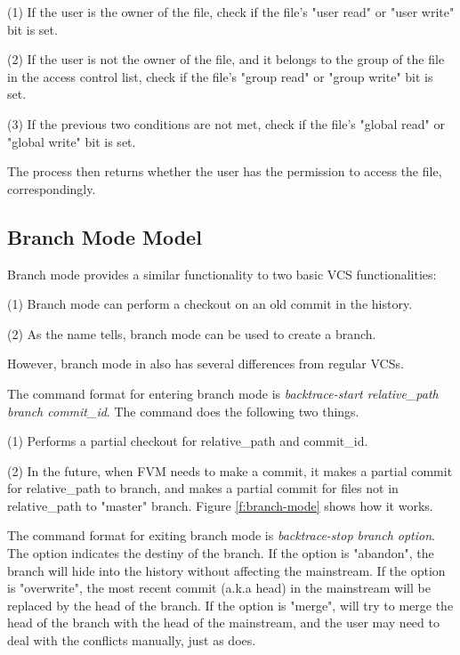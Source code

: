 (1) If the user is the owner of the file, check if the file's "user read" or
"user write" bit is set.

(2) If the user is not the owner of the file, and it belongs to the group of the
file in the access control list, check if the file's "group read" or "group
write" bit is set.

(3) If the previous two conditions are not met, check if the file's "global
read" or "global write" bit is set.

The process then returns whether the user has the permission to access the file,
correspondingly.


\subsection{Branch Mode Model}

Branch mode provides a similar functionality to two basic VCS functionalities:

(1) Branch mode can perform a checkout on an old commit in the history.

(2) As the name tells, branch mode can be used to create a branch.

However, branch mode in \sys also has several differences from regular VCSs.

The command format for entering branch mode is \textit{backtrace-start relative\_path
branch commit\_id}. The command does the following two things.

(1) Performs a partial checkout for relative\_path and commit\_id.

(2) In the future, when FVM needs to make a commit, it makes a partial
commit for relative\_path to branch, and makes a partial commit for files
not in relative\_path to "master" branch. Figure \ref{f:branch-mode} shows how
it works.

The command format for exiting branch mode is \textit{backtrace-stop branch
option}. The option indicates the destiny of the branch. If the option is
"abandon", the branch will hide into the history without affecting the
mainstream. If the option is "overwrite", the most recent
commit (a.k.a head) in the mainstream will be replaced by the head of the
branch. If the option is "merge", \sys will try to merge the head of the branch
with the head of the mainstream, and the user may need to deal with the
conflicts manually, just as \git does.

